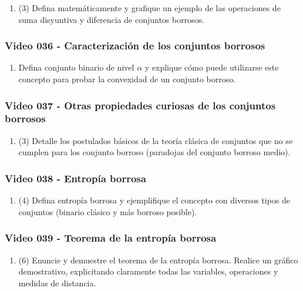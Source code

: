 \documentclass[a4paper,10pt,spanish,oneside]{article}
\begin{document}
\begin{enumerate}
\item (3) Defina matemáticamente y grafique un ejemplo de las operaciones de suma disyuntiva y diferencia de conjuntos borrosos.
\end{enumerate}

\subsubsection{Video 036 - Caracterización de los conjuntos borrosos}

\begin{enumerate}
\item Defina conjunto binario de nivel $\alpha$ y explique cómo puede utilizarse este concepto para probar la convexidad de un conjunto borroso.
\end{enumerate}

\subsubsection{Video 037 - Otras propiedades curiosas de los conjuntos borrosos}

\begin{enumerate}
\item (3) Detalle los postulados básicos de la teoría clásica de conjuntos que no se cumplen para los conjunto borroso (paradojas del conjunto borroso medio).
\end{enumerate}

\subsubsection{Video 038 - Entropía borrosa}

\begin{enumerate}
\item (4) Defina entropía borrosa y ejemplifique el concepto con diversos tipos de conjuntos (binario clásico y más borroso posible).
\end{enumerate}

\subsubsection{Video 039 - Teorema de la entropía borrosa}

\begin{enumerate}
\item (6) Enuncie y demuestre el teorema de la entropía borrosa. Realice un gráfico demostrativo, explicitando claramente todas las variables, operaciones y medidas de distancia.
\end{enumerate}
\end{document}
